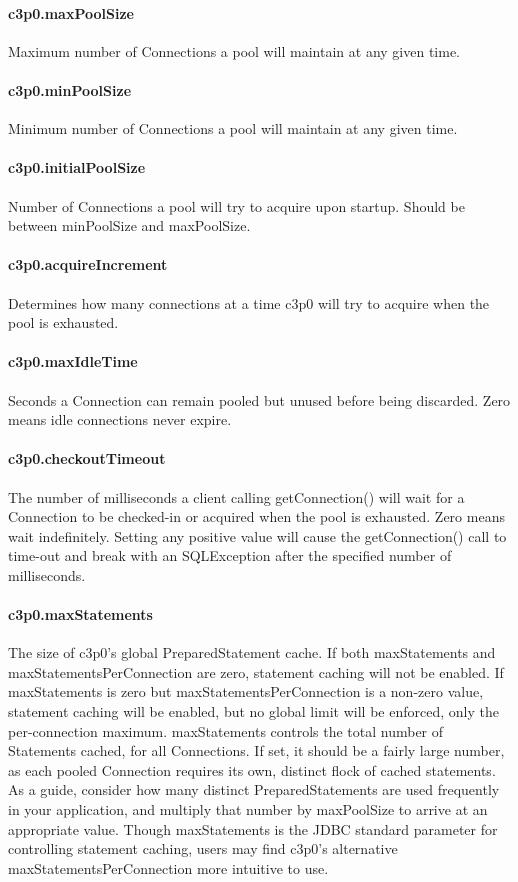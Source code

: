 \paragraph{c3p0.maxPoolSize}
Maximum number of Connections a pool will maintain at any given time.

\paragraph{c3p0.minPoolSize}
Minimum number of Connections a pool will maintain at any given time.

\paragraph{c3p0.initialPoolSize}
Number of Connections a pool will try to acquire upon startup. Should be between
minPoolSize and maxPoolSize.

\paragraph{c3p0.acquireIncrement}
Determines how many connections at a time c3p0 will try to acquire when the pool
is exhausted.

\paragraph{c3p0.maxIdleTime}
Seconds a Connection can remain pooled but unused before being discarded. Zero
means idle connections never expire.

\paragraph{c3p0.checkoutTimeout}
The number of milliseconds a client calling getConnection() will wait for a Connection
to be checked-in or acquired when the pool is exhausted. Zero means wait indefinitely.
Setting any positive value will cause the getConnection() call to time-out and
break with an SQLException after the specified number of milliseconds.

\paragraph{c3p0.maxStatements}
The size of c3p0's global PreparedStatement cache. If both maxStatements and
maxStatementsPerConnection are zero, statement caching will not be enabled.
If maxStatements is zero but maxStatementsPerConnection is a non-zero value,
statement caching will be enabled, but no global limit will be enforced, only
the per-connection maximum. maxStatements controls the total number of Statements
cached, for all Connections. If set, it should be a fairly large number, as each
pooled Connection requires its own, distinct flock of cached statements. As a guide,
consider how many distinct PreparedStatements are used frequently in your application,
and multiply that number by maxPoolSize to arrive at an appropriate value. Though
maxStatements is the JDBC standard parameter for controlling statement caching,
users may find c3p0's alternative maxStatementsPerConnection more intuitive to use.

